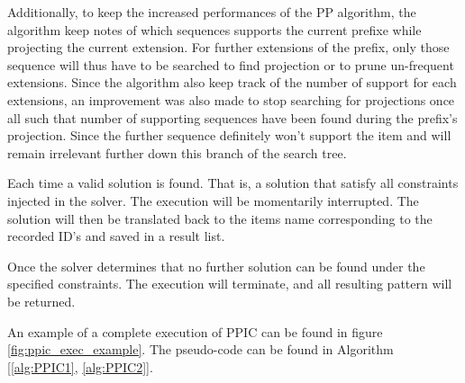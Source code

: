 \documentclass{eplmastersthesis}
\begin{document}
\begin{enumerate}
Additionally, to keep the increased performances of the PP algorithm, the algorithm keep notes of which sequences supports the current prefixe while projecting the current extension. For further extensions of the prefix, only those sequence will thus have to be searched to find projection or to prune un-frequent extensions. Since the algorithm also keep track of the number of support for each extensions, an improvement was also made to stop searching for projections once all such that number of supporting sequences have been found during the prefix's projection. Since the further sequence definitely won't support the item and will remain irrelevant further down this branch of the search tree. \newline

Each time a valid solution is found. That is, a solution that satisfy all constraints injected in the solver. The execution will be momentarily interrupted. The solution will then be translated back to the items name corresponding to the recorded ID's and saved in a result list. \newline

Once the solver determines that no further solution can be found under the specified constraints. The execution will terminate, and all resulting pattern will be returned.
\end{enumerate}

An example of a complete execution of PPIC can be found in figure \ref{fig:ppic_exec_example}. The pseudo-code can be found in Algorithm [\ref{alg:PPIC1}, \ref{alg:PPIC2}]. \newline
\end{document}
